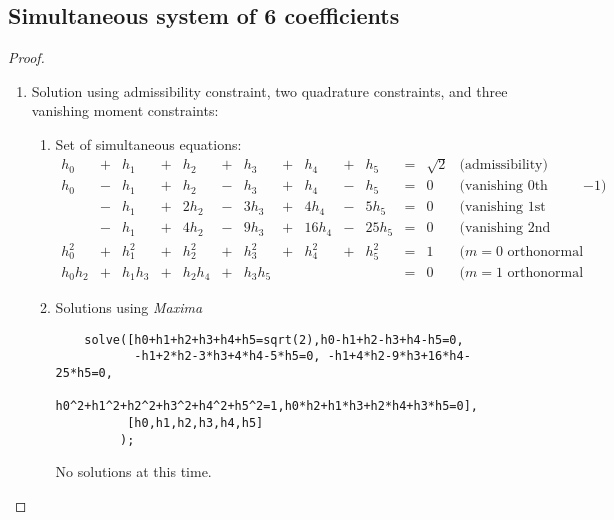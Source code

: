 \subsection {Simultaneous system of 6 coefficients}
\label{sec:sim_six}
\begin{proof}
\begin{enumerate}

\item Solution using admissibility constraint, two quadrature constraints, 
      and three vanishing moment constraints:

\begin{enumerate}
\item Set of simultaneous equations:
\[\begin{array}{*{13}{r}l}
  h_0 &+& h_1 &+& h_2 &+& h_3 &+& h_4 &+& h_5   &=& \sqrt{2}      
  &\text{(admissibility)} 
  \\
  h_0 &-& h_1 &+& h_2 &-& h_3 &+& h_4 &-& h_5 &=& 0          
  &\text{(vanishing 0th moment, partition of unity, zero at $-1$)} 
  \\
      &-& h_1 &+& 2h_2 &-& 3h_3 &+& 4h_4 &-& 5h_5   &=& 0
  &\text{(vanishing 1st moment)} 
  \\
      &-& h_1 &+& 4h_2 &-& 9h_3 &+& 16h_4 &-& 25h_5  &=& 0
  &\text{(vanishing 2nd moment)} 
  \\
  h_0^2 &+& h_1^2 &+& h_2^2 &+& h_3^2 &+& h_4^2 &+& h_5^2 &=& 1                  
  &\text{($m=0$ orthonormal quadrature condition)} 
  \\
  h_0h_2 &+& h_1h_3 &+& h_2h_4 &+& h_3h_5  &&  &&    &=& 0
  &\text{($m=1$ orthonormal quadrature condition)}
\end{array}\]

\item Solutions using {\em Maxima}\texttrademark \\
  \begin{verbatim}
    solve([h0+h1+h2+h3+h4+h5=sqrt(2),h0-h1+h2-h3+h4-h5=0,
           -h1+2*h2-3*h3+4*h4-5*h5=0, -h1+4*h2-9*h3+16*h4-25*h5=0,
           h0^2+h1^2+h2^2+h3^2+h4^2+h5^2=1,h0*h2+h1*h3+h2*h4+h3*h5=0],
          [h0,h1,h2,h3,h4,h5]
         );
  \end{verbatim}
  
  No solutions at this time. \problem
\end{enumerate}
\end{enumerate}
\end{proof}

